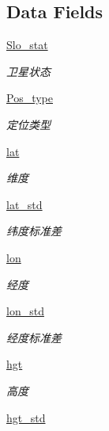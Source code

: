 \subsection*{Data Fields}
\begin{DoxyCompactItemize}
\item 
\hyperlink{classserial__af_1_1_g_p_s_a2b1d8a11ab31ff035025ebc9b910ce6e}{Slo\+\_\+stat}
\begin{DoxyCompactList}\small\item\em 卫星状态 \end{DoxyCompactList}\item 
\hyperlink{classserial__af_1_1_g_p_s_a3b8c649715d4c312450a44c84ec2266b}{Pos\+\_\+type}
\begin{DoxyCompactList}\small\item\em 定位类型 \end{DoxyCompactList}\item 
\hyperlink{classserial__af_1_1_g_p_s_a0a002dd349ba9bd682d75d3d129d353d}{lat}
\begin{DoxyCompactList}\small\item\em 维度 \end{DoxyCompactList}\item 
\hyperlink{classserial__af_1_1_g_p_s_aa62831fe0fcdb8fdff7308dc49648762}{lat\+\_\+std}
\begin{DoxyCompactList}\small\item\em 纬度标准差 \end{DoxyCompactList}\item 
\hyperlink{classserial__af_1_1_g_p_s_a35ce0cda1b860c2a3be10321ee555f45}{lon}
\begin{DoxyCompactList}\small\item\em 经度 \end{DoxyCompactList}\item 
\hyperlink{classserial__af_1_1_g_p_s_ad3d487dc4359d3255f5abbacade7750f}{lon\+\_\+std}
\begin{DoxyCompactList}\small\item\em 经度标准差 \end{DoxyCompactList}\item 
\hyperlink{classserial__af_1_1_g_p_s_a1910a4aad148f270369ff5bba9329ea0}{hgt}
\begin{DoxyCompactList}\small\item\em 高度 \end{DoxyCompactList}\item 
\hyperlink{classserial__af_1_1_g_p_s_a12114b23bb5eb1bc6b37d209d54c7d07}{hgt\+\_\+std}

\end{DoxyCompactItemize}
